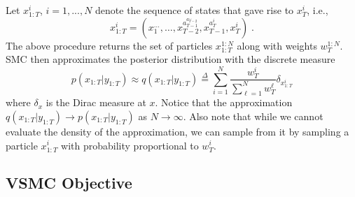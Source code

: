 \documentclass[12pt]{article}
\newcommand{\vsmc}{\textsc{VSMC}\xspace}
\newcommand{\smc}{\textsc{SMC}\xspace}
\begin{document}
Let $x_{1:T}^i$, $i=1,...,N$ denote the sequence of states that gave rise to $x_T^i$, i.e.,
\[
x_{1:T}^i=\left(x_1^{\ldots},\ldots, x_{T-2}^{a_{T-1}^{a_{T-2}^{\ldots}}}, x_{T-1}^{a_T^i}, x_T^i\right) \;.
\]
The above procedure returns the set of particles $x_{1:T}^{1:N}$ along with weights $w_T^{1:N}$. \smc then approximates the posterior distribution with the discrete measure
\[
p(x_{1:T}|y_{1:T}) \approx q(x_{1:T}|y_{1:T}) \overset{\Delta}{=} \sum_{i=1}^N\frac{w_T^i}{\sum_{\ell=1}^Nw_T^\ell}\delta_{x_{1:T}^i}
\]
where $\delta_x$ is the Dirac measure at $x$. Notice that the approximation $q(x_{1:T}|y_{1:T})\rightarrow p(x_{1:T}|y_{1:T})$ as $N\rightarrow\infty$. Also note that while we cannot evaluate the density of the approximation, we can sample from it by sampling a particle $x_{1:T}^i$ with probability proportional to $w_T^i$.

\subsection{\vsmc Objective}
\end{document}
